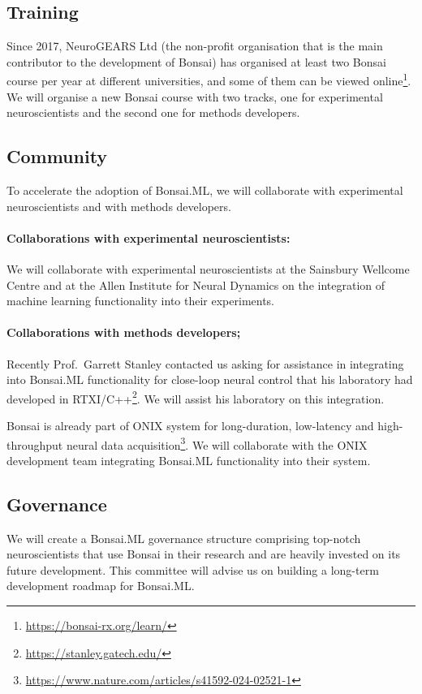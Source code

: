 \subsection*{Training}

Since 2017, NeuroGEARS Ltd (the non-profit organisation that is the main
contributor to the development of Bonsai) has organised at least two Bonsai
course per year at different universities, and some of them can be viewed
online\footnote[10]{\url{https://bonsai-rx.org/learn/}}. We will organise a new
Bonsai course with two tracks, one for experimental neuroscientists and the
second one for methods developers.

\subsection*{Community}

To accelerate the adoption of Bonsai.ML, we will collaborate with experimental
neuroscientists and with methods developers.

\paragraph{Collaborations with experimental neuroscientists:} We will
collaborate with experimental neuroscientists at the Sainsbury Wellcome Centre
and at the Allen Institute for Neural Dynamics on the integration of machine
learning functionality into their experiments.

\paragraph{Collaborations with methods developers;} Recently Prof.~Garrett
Stanley contacted us asking for assistance in integrating into Bonsai.ML
functionality for close-loop neural control that his laboratory had developed
in RTXI/C++\footnote[11]{\url{https://stanley.gatech.edu/}}. We will assist his
laboratory on this integration.

Bonsai is already part of ONIX system for long-duration, low-latency and
high-throughput neural data
acquisition\footnote[13]{\url{https://www.nature.com/articles/s41592-024-02521-1}}.  We
will collaborate with the ONIX development team integrating Bonsai.ML
functionality into their system.

\subsection*{Governance}

We will create a Bonsai.ML governance structure comprising top-notch
neuroscientists that use Bonsai in their research and are heavily invested on
its future development.
%
This committee will advise us on building a long-term development roadmap for
Bonsai.ML.
